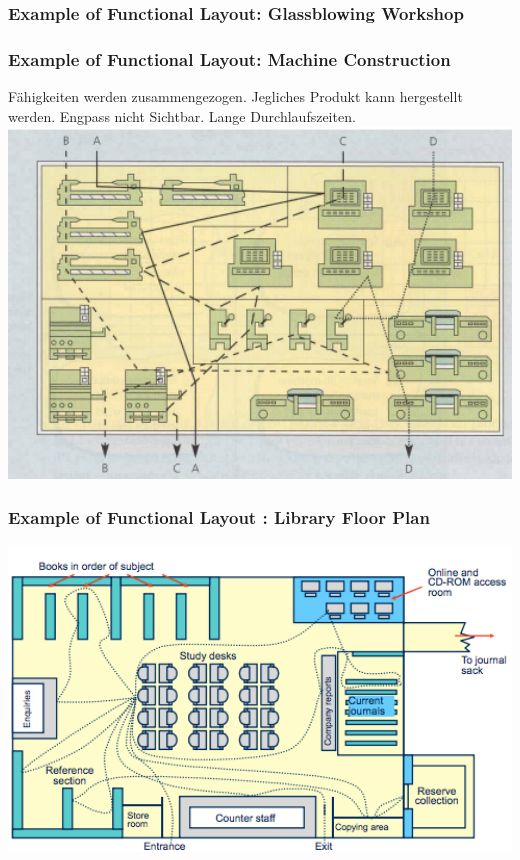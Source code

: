 \subsubsection{Example of Functional Layout: Glassblowing Workshop}
\subsubsection{Example of Functional Layout: Machine Construction}
F\"ahigkeiten werden zusammengezogen. Jegliches Produkt kann hergestellt werden. Engpass nicht Sichtbar. Lange Durchlaufszeiten.\\
\includegraphics[width=1\textwidth]{W05/machineconstruction}
\subsubsection{Example of Functional Layout : Library Floor Plan}
\includegraphics[width=1\textwidth]{W05/libraryfloorplan}
